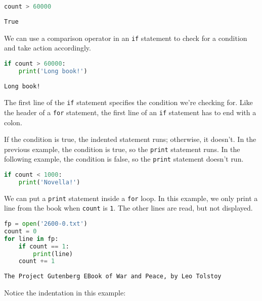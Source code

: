 \begin{lstlisting}[language=Python]
count > 60000
\end{lstlisting}

\begin{lstlisting}[]
True
\end{lstlisting}

We can use a comparison operator in an \passthrough{\lstinline!if!}
statement to check for a condition and take action accordingly.

\begin{lstlisting}[language=Python]
if count > 60000:
    print('Long book!')
\end{lstlisting}

\begin{lstlisting}[]
Long book!
\end{lstlisting}

The first line of the \passthrough{\lstinline!if!} statement specifies
the condition we're checking for. Like the header of a
\passthrough{\lstinline!for!} statement, the first line of an
\passthrough{\lstinline!if!} statement has to end with a colon.

If the condition is true, the indented statement runs; otherwise, it
doesn't. In the previous example, the condition is true, so the
\passthrough{\lstinline!print!} statement runs. In the following
example, the condition is false, so the \passthrough{\lstinline!print!}
statement doesn't run.

\begin{lstlisting}[language=Python]
if count < 1000:
    print('Novella!')
\end{lstlisting}

We can put a \passthrough{\lstinline!print!} statement inside a
\passthrough{\lstinline!for!} loop. In this example, we only print a
line from the book when \passthrough{\lstinline!count!} is
\passthrough{\lstinline!1!}. The other lines are read, but not
displayed.

\begin{lstlisting}[language=Python]
fp = open('2600-0.txt')
count = 0
for line in fp:
    if count == 1:
        print(line)
    count += 1
\end{lstlisting}

\begin{lstlisting}[]
The Project Gutenberg EBook of War and Peace, by Leo Tolstoy
\end{lstlisting}

Notice the indentation in this example:

